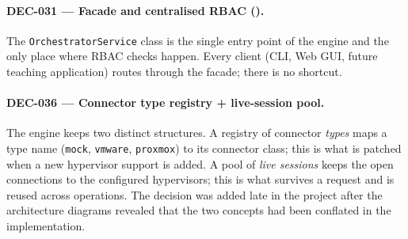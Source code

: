 \paragraph{DEC-031 — Facade and centralised RBAC ().}
The \texttt{OrchestratorService} class is the single entry point of
the engine and the only place where RBAC checks happen. Every
client (CLI, Web GUI, future teaching application) routes through
the facade; there is no shortcut.

\paragraph{DEC-036 — Connector type registry + live-session pool.}
The engine keeps two distinct structures. A registry of connector
\emph{types} maps a type name (\texttt{mock}, \texttt{vmware},
\texttt{proxmox}) to its connector class; this is what is patched
when a new hypervisor support is added. A pool of \emph{live
sessions} keeps the open connections to the configured hypervisors;
this is what survives a request and is reused across operations. The
decision was added late in the project after the architecture
diagrams revealed that the two concepts had been conflated in the
implementation.

